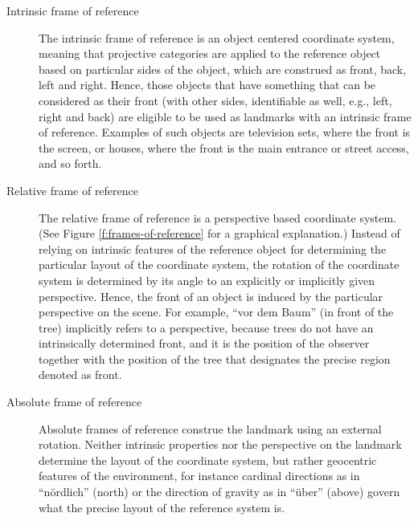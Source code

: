 \begin{description}
\item[Intrinsic frame of reference]
The intrinsic frame of reference is an object centered coordinate 
system, meaning that projective categories are applied to the 
reference object based on particular sides of the object, which 
are construed as front, back, left and right. Hence, those objects 
that have something that can be considered as their front 
(with other sides, identifiable as well, e.g., left, right and back) 
are eligible to be used as landmarks with an intrinsic frame of 
reference. Examples of such objects are television sets, where 
the front is the screen, or houses, where the front is the main 
entrance or street access, and so forth.
\item[Relative frame of reference]
The relative frame of reference is a perspective based coordinate 
system. (See Figure \ref{f:frames-of-reference} for a graphical 
explanation.) Instead of relying on intrinsic features of the 
reference object for determining the particular layout of the 
coordinate system, the rotation of the coordinate system is 
determined by its angle to an explicitly or implicitly given 
perspective. Hence, the front of an object is induced by the 
particular perspective on the scene. For example, ``vor dem 
Baum'' (in front of the tree) implicitly refers to a perspective, 
because trees do not have an intrinsically determined front, and 
it is the position of the observer together with the position of the 
tree that designates the precise region denoted as front.
\item[Absolute frame of reference] Absolute frames of reference construe 
the landmark using an external rotation. Neither intrinsic 
properties nor the perspective on the landmark determine the layout 
of the coordinate system, but rather geocentric features of the 
environment, for instance cardinal directions as in 
``n\"ordlich'' (north) or the direction of gravity as in ``\"uber'' (above)
govern what the precise layout of the reference system is.
\end{description} 

